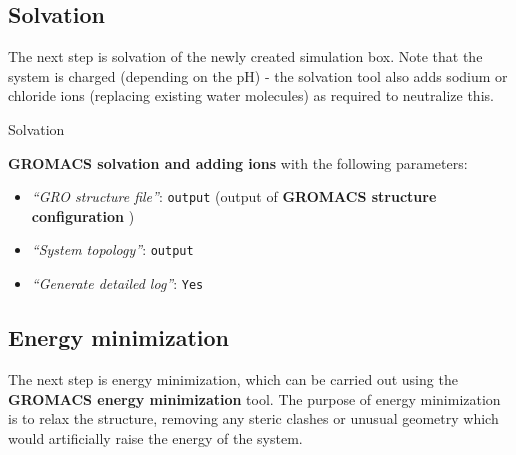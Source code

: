 \documentclass[twocolumn]{bmcart}%
\providecommand{\tightlist}{%
  \setlength{\itemsep}{0pt}\setlength{\parskip}{0pt}}
\begin{document}
\subsection*{Solvation}\label{solvation}
The next step is solvation of the newly created simulation box. Note
that the system is charged (depending on the pH) - the solvation tool
also adds sodium or chloride ions (replacing existing water molecules) as required to neutralize this.

\begin{handson_box_colour}{Solvation}


  \textbf{GROMACS solvation and adding ions} with the following
  parameters:
  \begin{itemize}
  \tightlist
  \item
    \emph{``GRO structure file''}: \texttt{output} (output of
    \textbf{GROMACS structure configuration} )
  \item
    \emph{``System topology''}: \texttt{output}
  \item
    \emph{``Generate detailed log''}: \texttt{Yes}
  \end{itemize}

\end{handson_box_colour}

\subsection*{Energy minimization}\label{energy-minimization}

The next step is energy minimization, which can be carried out using the
\textbf{GROMACS energy minimization} tool. The purpose of energy minimization is to relax the structure, removing any steric clashes or unusual geometry which would artificially raise the energy of the system.
\end{document}

